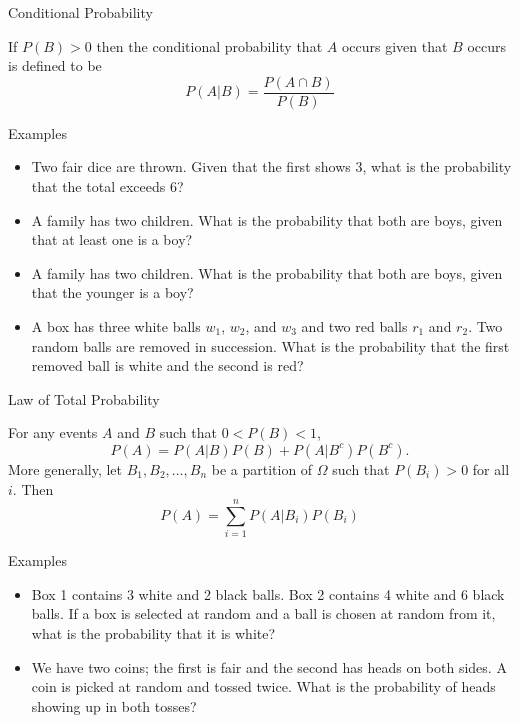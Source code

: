 \documentclass[t]{beamer}
\begin{document}
\begin{frame}{Conditional Probability}
  \footnotesize
  \pause
  \begin{definition}[]
    If $P(B) > 0$ then the conditional probability that $A$ occurs given that $B$ occurs is defined to be
      \begin{equation*}
        P(A | B) = \frac{P(A \cap B)}{P(B)}
      \end{equation*}
  \end{definition}
  \pause
  \begin{block}{Examples}
    \begin{itemize}
      \item \pause Two fair dice are thrown. Given that the first shows 3, what is the probability that the total exceeds 6?
      \item \pause A family has two children. What is the probability that both are boys, given that at least one is a boy?
      \item \pause A family has two children. What is the probability that both are boys, given that the younger is a boy?
      \item \pause A box has three white balls $w_1$, $w_2$, and $w_3$ and two red balls $r_1$ and $r_2$. Two random balls are removed in succession. What is the probability that the first removed ball is white and the second is red?
    \end{itemize}
  \end{block}
  \normalsize
\end{frame}

\begin{frame}{Law of Total Probability}
  \footnotesize
  \pause
  \begin{theorem}
    For any events $A$ and $B$ such that $0 < P(B) < 1$,
      \begin{equation*}
        P(A) = P(A|B)P(B) + P(A|B^c)P(B^c).
      \end{equation*}
    \pause More generally, let $B_1, B_2,\ldots,B_n$ be a partition of $\Omega$ such that $P(B_i) > 0$ for all $i$. Then
      \begin{equation*}
        P(A) = \sum_{i=1}^n P(A|B_i)P(B_i)
      \end{equation*}
  \end{theorem}
  \pause
  \begin{block}{Examples}
    \begin{itemize}
      \item \pause Box 1 contains 3 white and 2 black balls. Box 2 contains 4 white and 6 black balls. If a box is selected at random and a ball is chosen at random from it, what is the probability that it is white?
      \item \pause We have two coins; the first is fair and the second has heads on both sides. A coin is picked at random and tossed twice. What is the probability of heads showing up in both tosses?
    \end{itemize}
  \end{block}
  \normalsize
\end{frame}
\end{document}
